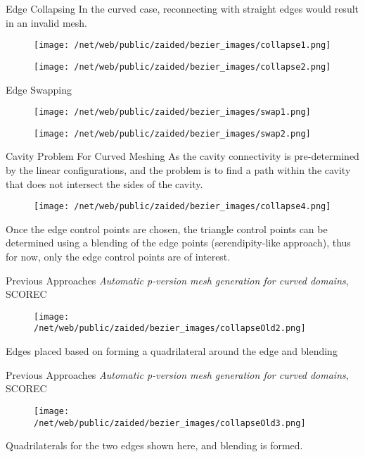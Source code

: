 \documentclass[12pt]{beamer}
\begin{document}
\begin{frame}{Edge Collapsing}
In the curved case, reconnecting with straight edges would result in an invalid mesh.
\begin{figure}
  \centering
  \texttt{[image: /net/web/public/zaided/bezier\_images/collapse1.png]} 
\end{figure}
\begin{figure}
  \centering
  \texttt{[image: /net/web/public/zaided/bezier\_images/collapse2.png]} 
\end{figure}
\end{frame}

\begin{frame}{Edge Swapping}
\begin{figure}
  \centering
  \texttt{[image: /net/web/public/zaided/bezier\_images/swap1.png]} 
\end{figure}
\begin{figure}
  \centering
  \texttt{[image: /net/web/public/zaided/bezier\_images/swap2.png]} 
\end{figure}
\end{frame}
\begin{frame}{Cavity Problem For Curved Meshing}
As the cavity connectivity is pre-determined by the linear configurations, and the problem is to find a path within the cavity that does not intersect the sides of the cavity.
\begin{figure}
  \centering
  \texttt{[image: /net/web/public/zaided/bezier\_images/collapse4.png]} 
\end{figure}
Once the edge control points are chosen, the triangle control points can be determined using a blending of the edge points (serendipity-like approach), thus for now, only the edge control points are of interest.
\end{frame}
\begin{frame}{Previous Approaches}
\textit{Automatic p-version mesh generation for curved domains}, SCOREC 
\begin{figure}
  \centering
  \texttt{[image: /net/web/public/zaided/bezier\_images/collapseOld2.png]} 
\end{figure}
Edges placed based on forming a quadrilateral around the edge and blending
\end{frame}
\begin{frame}{Previous Approaches}
\textit{Automatic p-version mesh generation for curved domains}, SCOREC
\begin{figure}
  \centering
  \texttt{[image: /net/web/public/zaided/bezier\_images/collapseOld3.png]} 
\end{figure}
Quadrilaterals for the two edges shown here, and blending is formed. 
\end{frame}
\end{document}
